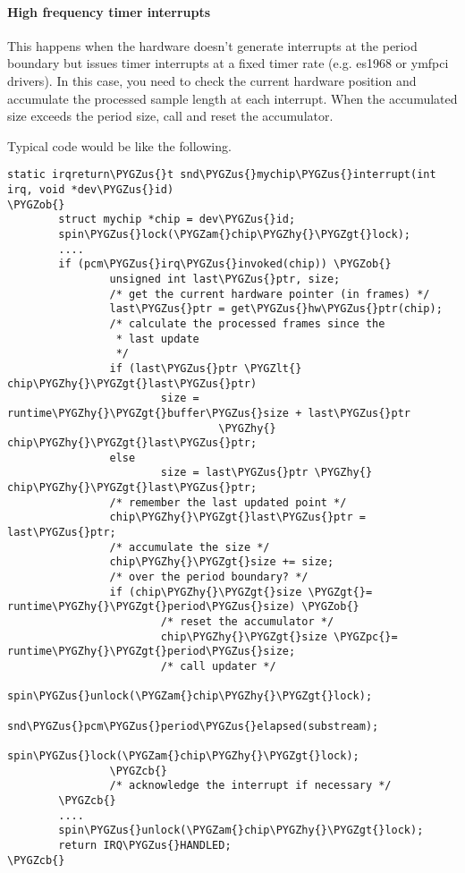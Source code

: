 \documentclass[a4paper,8pt,english]{sphinxmanual}
\def\PYGZus{\char`\_}
\def\PYGZob{\char`\{}
\def\PYGZcb{\char`\}}
\def\PYGZam{\char`\&}
\def\PYGZlt{\char`\<}
\def\PYGZgt{\char`\>}
\def\PYGZpc{\char`\%}
\def\PYGZhy{\char`\-}
\begin{document}
\paragraph{High frequency timer interrupts}
\label{sound/kernel-api/writing-an-alsa-driver:high-frequency-timer-interrupts}
This happens when the hardware doesn't generate interrupts at the period
boundary but issues timer interrupts at a fixed timer rate (e.g. es1968
or ymfpci drivers). In this case, you need to check the current hardware
position and accumulate the processed sample length at each interrupt.
When the accumulated size exceeds the period size, call
 and reset the accumulator.

Typical code would be like the following.

\begin{Verbatim}[commandchars=\\\{\}]
static irqreturn\PYGZus{}t snd\PYGZus{}mychip\PYGZus{}interrupt(int irq, void *dev\PYGZus{}id)
\PYGZob{}
        struct mychip *chip = dev\PYGZus{}id;
        spin\PYGZus{}lock(\PYGZam{}chip\PYGZhy{}\PYGZgt{}lock);
        ....
        if (pcm\PYGZus{}irq\PYGZus{}invoked(chip)) \PYGZob{}
                unsigned int last\PYGZus{}ptr, size;
                /* get the current hardware pointer (in frames) */
                last\PYGZus{}ptr = get\PYGZus{}hw\PYGZus{}ptr(chip);
                /* calculate the processed frames since the
                 * last update
                 */
                if (last\PYGZus{}ptr \PYGZlt{} chip\PYGZhy{}\PYGZgt{}last\PYGZus{}ptr)
                        size = runtime\PYGZhy{}\PYGZgt{}buffer\PYGZus{}size + last\PYGZus{}ptr
                                 \PYGZhy{} chip\PYGZhy{}\PYGZgt{}last\PYGZus{}ptr;
                else
                        size = last\PYGZus{}ptr \PYGZhy{} chip\PYGZhy{}\PYGZgt{}last\PYGZus{}ptr;
                /* remember the last updated point */
                chip\PYGZhy{}\PYGZgt{}last\PYGZus{}ptr = last\PYGZus{}ptr;
                /* accumulate the size */
                chip\PYGZhy{}\PYGZgt{}size += size;
                /* over the period boundary? */
                if (chip\PYGZhy{}\PYGZgt{}size \PYGZgt{}= runtime\PYGZhy{}\PYGZgt{}period\PYGZus{}size) \PYGZob{}
                        /* reset the accumulator */
                        chip\PYGZhy{}\PYGZgt{}size \PYGZpc{}= runtime\PYGZhy{}\PYGZgt{}period\PYGZus{}size;
                        /* call updater */
                        spin\PYGZus{}unlock(\PYGZam{}chip\PYGZhy{}\PYGZgt{}lock);
                        snd\PYGZus{}pcm\PYGZus{}period\PYGZus{}elapsed(substream);
                        spin\PYGZus{}lock(\PYGZam{}chip\PYGZhy{}\PYGZgt{}lock);
                \PYGZcb{}
                /* acknowledge the interrupt if necessary */
        \PYGZcb{}
        ....
        spin\PYGZus{}unlock(\PYGZam{}chip\PYGZhy{}\PYGZgt{}lock);
        return IRQ\PYGZus{}HANDLED;
\PYGZcb{}
\end{Verbatim}
\end{document}
